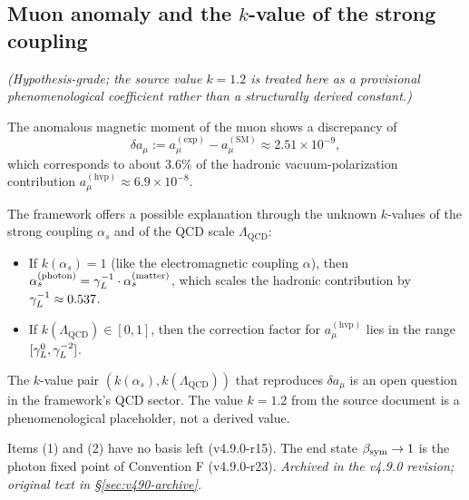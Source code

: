 \subsection{Muon anomaly and the $k$-value of the strong coupling}
\label{sec:muon-anomaly}

\begin{proposition}
\label{prop:muon-g2}
\emph{(Hypothesis-grade; the source value $k=1.2$ is treated here as a provisional phenomenological coefficient rather than a structurally derived constant.)}

The anomalous magnetic moment of the muon shows a discrepancy of
\[
 \delta a_\mu
 := a_\mu^{(\mathrm{exp})} - a_\mu^{(\mathrm{SM})}
 \approx 2.51\times 10^{-9},
\]
which corresponds to about $3.6\%$ of the hadronic vacuum-polarization
contribution $a_\mu^{(\mathrm{hvp})} \approx 6.9\times 10^{-8}$.

The framework offers a possible explanation through the unknown
$k$-values of the strong coupling $\alpha_s$ and of the QCD scale
$\Lambda_{\mathrm{QCD}}$:
\begin{itemize}
 \item If $k(\alpha_s) = 1$ (like the electromagnetic coupling $\alpha$),
 then $\alpha_s^{(\mathrm{photon})} = \gamma_L^{-1}\cdot\alpha_s^{(\mathrm{matter})}$,
 which scales the hadronic contribution by $\gamma_L^{-1}\approx 0.537$.
 \item If $k(\Lambda_{\mathrm{QCD}}) \in [0,1]$, then the correction factor
 for $a_\mu^{(\mathrm{hvp})}$ lies in the range $[\gamma_L^0,\gamma_L^{-2}]$.
\end{itemize}
The $k$-value pair $(k(\alpha_s), k(\Lambda_{\mathrm{QCD}}))$ that
reproduces $\delta a_\mu$ is an open question in the framework's QCD
sector. The value $k=1.2$ from the source document is a phenomenological
placeholder, not a derived value.
\end{proposition}

\begin{proposition}\label{prop:saturation}
Items (1) and (2) have no basis left (v4.9.0-r15).  The end state \(\beta_{\mathrm{sym}}\to1\) is the photon fixed point of Convention F (v4.9.0-r23).
\emph{Archived in the v4.9.0 revision; original text in \S\ref{sec:v490-archive}.}
\end{proposition}

